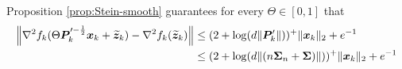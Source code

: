 Proposition \ref{prop:Stein-smooth} guarantees for every $\Theta \in [0,1]$ that
\begin{align}
\notag \left\|\nabla^2f_k(\Theta \bm{P}_k'^{-\frac{1}{2}}\bm{x}_k + \widetilde{\bm{z}}_k) - \nabla^2 f_k(\widetilde{\bm{z}}_k)\right\| &\leq (2+\log(d\|\bm{P}_k'\|))^+ \|\bm{x}_k\|_2 + e^{-1}\nonumber \\ 
&\leq (2+\log(d\|(n\bm{\Sigma}_n + \bm{\Sigma})\|))^+ \|\bm{x}_k\|_2 + e^{-1}
\end{align}

